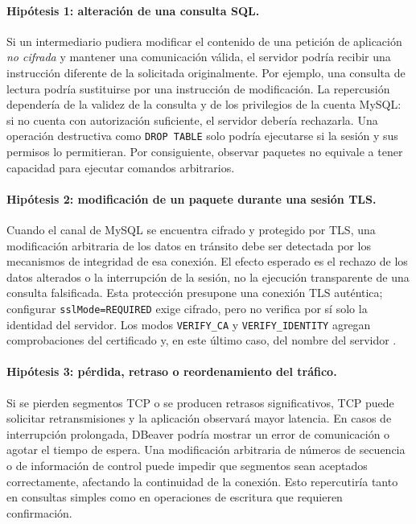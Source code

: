 \documentclass[10pt,a4paper]{article}
\begin{document}
\paragraph{Hipótesis 1: alteración de una consulta SQL.}
Si un intermediario pudiera modificar el contenido de una petición de aplicación \emph{no cifrada} y mantener una comunicación válida, el servidor podría recibir una instrucción diferente de la solicitada originalmente. Por ejemplo, una consulta de lectura podría sustituirse por una instrucción de modificación. La repercusión dependería de la validez de la consulta y de los privilegios de la cuenta MySQL: si no cuenta con autorización suficiente, el servidor debería rechazarla. Una operación destructiva como \texttt{DROP TABLE} solo podría ejecutarse si la sesión y sus permisos lo permitieran. Por consiguiente, observar paquetes no equivale a tener capacidad para ejecutar comandos arbitrarios.

\paragraph{Hipótesis 2: modificación de un paquete durante una sesión TLS.}
Cuando el canal de MySQL se encuentra cifrado y protegido por TLS, una modificación arbitraria de los datos en tránsito debe ser detectada por los mecanismos de integridad de esa conexión. El efecto esperado es el rechazo de los datos alterados o la interrupción de la sesión, no la ejecución transparente de una consulta falsificada. Esta protección presupone una conexión TLS auténtica; configurar \texttt{sslMode=REQUIRED} exige cifrado, pero no verifica por sí solo la identidad del servidor. Los modos \texttt{VERIFY\_CA} y \texttt{VERIFY\_IDENTITY} agregan comprobaciones del certificado y, en este último caso, del nombre del servidor \cite{mysqlssl}.

\paragraph{Hipótesis 3: pérdida, retraso o reordenamiento del tráfico.}
Si se pierden segmentos TCP o se producen retrasos significativos, TCP puede solicitar retransmisiones y la aplicación observará mayor latencia. En casos de interrupción prolongada, DBeaver podría mostrar un error de comunicación o agotar el tiempo de espera. Una modificación arbitraria de números de secuencia o de información de control puede impedir que segmentos sean aceptados correctamente, afectando la continuidad de la conexión. Esto repercutiría tanto en consultas simples como en operaciones de escritura que requieren confirmación.
\end{document}
